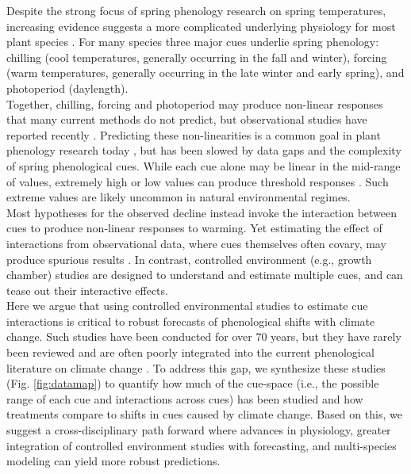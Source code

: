 \documentclass[11pt,letter]{article}
\begin{document}
Despite the strong focus of spring phenology research on spring temperatures, increasing evidence suggests a more complicated underlying physiology for most plant species \citep[e.g.,][]{zohner2016,gauzere2019,ettinger2020}. For many species three major cues underlie spring phenology: chilling (cool temperatures, generally occurring in the fall and winter), forcing (warm temperatures, generally occurring in the late winter and early spring), and photoperiod (daylength). \\

Together, chilling, forcing and photoperiod may produce non-linear responses that many current methods do not predict, but observational studies have reported recently \citep{fu2015}. Predicting these non-linearities is a common goal in plant phenology research today \citep{gusewell2017,martlusch2017,gauzere2019,chen2019,keenan2019}, but has been slowed by data gaps and the complexity of spring phenological cues. While each cue alone may be linear in the mid-range of values, extremely high or low values can produce threshold responses \citep{major1980,Heide:1993,Partanen:1998aa,Singh:2017,rinne2018}. Such extreme values are likely uncommon in natural environmental regimes.\\

Most hypotheses for the observed decline instead invoke the interaction between cues to produce non-linear responses to warming. Yet estimating the effect of interactions from observational data, where cues themselves often covary, may produce spurious results \citep{ettinger2020}. In contrast, controlled environment (e.g., growth chamber) studies are designed to understand and estimate multiple cues, and can tease out their interactive effects. \\ %

Here we argue that using controlled environmental studies to estimate cue interactions is critical to robust forecasts of phenological shifts with climate change. Such studies have been conducted for over 70 years, but they have rarely been reviewed and are often poorly integrated into the current phenological literature on climate change \citep[e.g.,][]{fu2015,richardson2018}. To address this gap, we synthesize these studies (Fig. \ref{fig:datamap}) to quantify how much of the cue-space (i.e., the possible range of each cue and interactions across cues) has been studied and how treatments compare to shifts in cues caused by climate change. Based on this, we suggest a cross-disciplinary path forward where advances in physiology, greater integration of controlled environment studies with forecasting, and multi-species modeling can yield more robust predictions.\\
\end{document}
